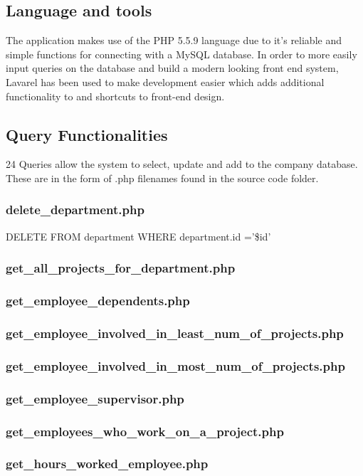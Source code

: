 \documentclass[11pt,letterpaper]{article}
\begin{document}
\subsection{Language and tools}
	The application makes use of the PHP 5.5.9 language due to it's reliable and simple functions for connecting with a MySQL database. In order to more easily input queries on the database and build a modern looking front end system, Lavarel has been used to make development easier which adds additional functionality to and shortcuts to front-end design.\\

\subsection{Query Functionalities}
	24 Queries allow the system to select, update and add to the company database. These are in the form of .php filenames found in the source code folder.
	\subsubsection{delete\_department.php}
	DELETE FROM department WHERE department.id ='\$id'
	\subsubsection{get\_all\_projects\_for\_department.php}
	\subsubsection{get\_employee\_dependents.php}
	\subsubsection{get\_employee\_involved\_in\_least\_num\_of\_projects.php}
	\subsubsection{get\_employee\_involved\_in\_most\_num\_of\_projects.php}
	\subsubsection{get\_employee\_supervisor.php}
	\subsubsection{get\_employees\_who\_work\_on\_a\_project.php}
	\subsubsection{get\_hours\_worked\_employee.php}
\end{document}
